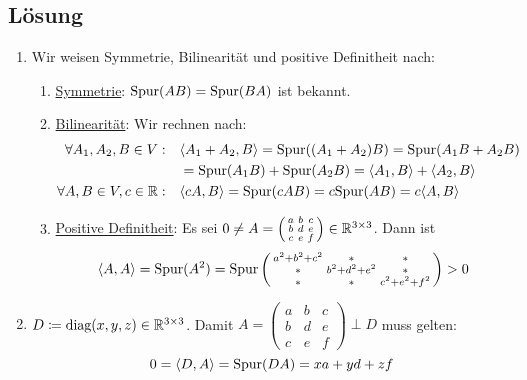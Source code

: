 \subsection{Lösung}
\begin{enumerate}
	\item Wir weisen Symmetrie, Bilinearität und positive Definitheit nach:
		\begin{enumerate}
		 	\item \underline{Symmetrie}: \( \text{Spur}(AB)=\text{Spur}(BA) \) ist bekannt.
		 	\item \underline{Bilinearität}: Wir rechnen nach:
		 		\begin{align*}
		 		 	\forall A_1, A_2,B \in V: \quad &\langle A_1 + A_2, B \rangle = \text{Spur}((A_1+A_2)B) = \text{Spur}(A_1B+A_2B) \\
		 		 	 &= \text{Spur}(A_1B)+\text{Spur}(A_2B) = \langle A_1,B \rangle + \langle A_2,B \rangle \\
		 		 	\forall A,B \in V, c \in \mathbb{R}: \quad &\langle cA,B \rangle = \text{Spur}(cAB)=c\text{Spur}(AB) = c\langle A,B \rangle
		 		 \end{align*} 
		 	\item \underline{Positive Definitheit}: Es sei \( 0 \neq A = \left( \begin{smallmatrix}
		 		a & b & c \\
		 		b & d & e \\
		 		c & e & f
		 	\end{smallmatrix} \right) \in \mathbb{R}^{3 \times 3} \). Dann ist
		 		\begin{equation*}
		 			\langle A,A \rangle = \text{Spur}(A^2) = \text{Spur}\left( \begin{smallmatrix}
		 				a^2+b^2+c^2 & \ast & \ast \\
		 				\ast & b^2+d^2+e^2 & \ast \\
		 				\ast & \ast & c^2+e^2+f^2 
		 			\end{smallmatrix} \right) > 0
		 		\end{equation*}
		 \end{enumerate}
	\item \( D \coloneqq \text{diag}(x,y,z) \in \mathbb{R}^{3 \times 3} \). Damit \( A = \left( \begin{smallmatrix}
		a & b & c \\
		b & d & e \\
		c & e & f
	\end{smallmatrix} \right) \perp D \) muss gelten:
	\begin{equation*}
		0 = \langle D,A \rangle = \text{Spur}(DA) = xa+yd+zf
	\end{equation*}

\end{enumerate}
